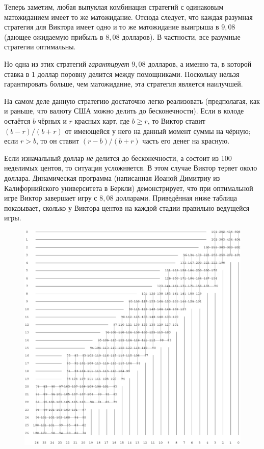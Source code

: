 \documentclass[twoside]{book}
\begin{document}
Теперь заметим, любая выпуклая комбинация стратегий с одинаковым матожиданием имеет то же матожидание.
Отсюда следует, что каждая разумная стратегия для Виктора имеет одно и то же матожидание выигрыша в $9{,}08$ (дающее ожидаемую прибыль в $8{,}08$ долларов).
В частности, все разумные стратегии оптимальны.

Но одна из этих стратегий \emph{гарантирует} $9{,}08$ долларов, а именно та, в которой ставка в 1 доллар поровну делится между помощниками.
Поскольку нельзя гарантировать больше, чем матожидание, эта стратегия является наилучшей.\heart

На самом деле данную стратегию достаточно легко реализовать (предполагая, как и раньше, что валюту США можно делить до бесконечности).
Если в колоде остаётся $b$ чёрных и $r$ красных карт, где $b\ge r$, то Виктор ставит $(b - r)/(b + r)$ от имеющейся у него на данный момент суммы на чёрную; если $r > b$, то он ставит $(r - b)/(b + r)$ часть его денег на красную.

\medskip

Если изначальный доллар \emph{не} делится до бесконечности, а состоит из 100 неделимых центов, то ситуация усложняется.
В этом случае Виктор теряет около доллара.
Динамическая программа (написанная Иоаной Димитриу %
из Калифорнийского университета в Беркли) демонстрирует, что при оптимальной игре Виктор завершает игру с $8{,}08$ долларами.
Приведённая ниже таблица показывает, сколько у Виктора центов на каждой стадии правильно ведущейся игры.

\begin{figure}[!ht]
\centering
\includegraphics[width=\textwidth]{Figs/Games/ioana} %
\end{figure}
\end{document}
